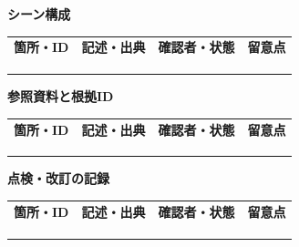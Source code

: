 \documentclass[11pt,a4paper]{article}
\begin{document}
\par{}\noindent\textbf{シーン構成}\par\vspace{1mm}
{\fontsize{8.5}{13}\selectfont
\begin{tabularx}{\linewidth}{@{}XXXX@{}}
\textbf{箇所・ID} & \textbf{記述・出典} & \textbf{確認者・状態} & \textbf{留意点}\\[2mm]
\strut & \strut & \strut & \strut\\[5mm]
\strut & \strut & \strut & \strut\\[5mm]
\strut & \strut & \strut & \strut\\[5mm]
\end{tabularx}
}\vspace{2mm}\par
{}
\par{}\noindent\textbf{参照資料と根拠ID}\par\vspace{1mm}
{\fontsize{8.5}{13}\selectfont
\begin{tabularx}{\linewidth}{@{}XXXX@{}}
\textbf{箇所・ID} & \textbf{記述・出典} & \textbf{確認者・状態} & \textbf{留意点}\\[2mm]
\strut & \strut & \strut & \strut\\[5mm]
\strut & \strut & \strut & \strut\\[5mm]
\strut & \strut & \strut & \strut\\[5mm]
\end{tabularx}
}\vspace{2mm}\par
{}
\par{}\noindent\textbf{点検・改訂の記録}\par\vspace{1mm}
{\fontsize{8.5}{13}\selectfont
\begin{tabularx}{\linewidth}{@{}XXXX@{}}
\textbf{箇所・ID} & \textbf{記述・出典} & \textbf{確認者・状態} & \textbf{留意点}\\[2mm]
\strut & \strut & \strut & \strut\\[5mm]
\strut & \strut & \strut & \strut\\[5mm]
\strut & \strut & \strut & \strut\\[5mm]
\end{tabularx}
}\vspace{2mm}\par
\end{document}
